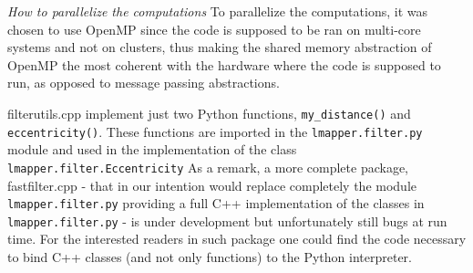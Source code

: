\textit{How to parallelize the computations} To parallelize the computations, it was chosen to use OpenMP since the code is supposed to be ran on multi-core systems and not on clusters, thus making the shared memory abstraction of OpenMP the most coherent with the hardware where the code is supposed to run, as opposed to message passing abstractions.

filterutils.cpp implement just two Python functions, \lstinline|my_distance()| and \lstinline|eccentricity()|. These functions are imported in the \lstinline|lmapper.filter.py| module and used in the implementation of the class \lstinline|lmapper.filter.Eccentricity|
As a remark, a more complete package, fastfilter.cpp - that in our intention would replace completely the module \lstinline|lmapper.filter.py| providing a full C++ implementation of the classes in \lstinline|lmapper.filter.py| - is under development but unfortunately still bugs at run time. For the interested readers in such package one could find the code necessary to bind C++ classes (and not only functions) to the Python interpreter.